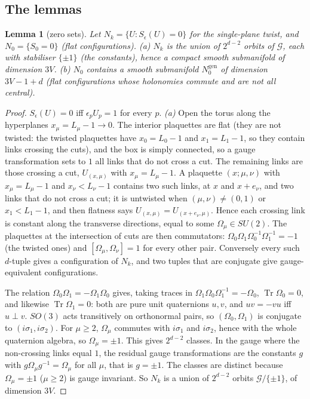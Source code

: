 \documentclass[11pt,a4paper]{article}
\theoremstyle{plain}
\newtheorem{lemma}[theorem]{Lemma}
\theoremstyle{definition}
\theoremstyle{remark}
\numberwithin{equation}{section}
\newcommand{\Tr}{\operatorname{Tr}}
\begin{document}
\subsection{The lemmas}
\begin{lemma}[zero sets]\label{lem:A}
Let $N_k=\{U:S_\epsilon(U)=0\}$ for the single-plane twist, and $N_0=\{S_0=0\}$ (flat configurations). (a) $N_k$ is the union of $2^{d-2}$ orbits of $\mathcal G$, each with stabiliser $\{\pm1\}$ (the constants), hence a compact smooth submanifold of dimension $3V$. (b) $N_0$ contains a smooth submanifold $N_0^{\mathrm{gen}}$ of dimension $3V-1+d$ (flat configurations whose holonomies commute and are not all central).
\end{lemma}
\begin{proof}
$S_\epsilon(U)=0$ iff $\epsilon_pU_p=1$ for every $p$. \emph{(a)} Open the torus along the hyperplanes $x_\mu=L_\mu-1\to0$. The interior plaquettes are flat (they are not twisted: the twisted plaquettes have $x_0=L_0-1$ and $x_1=L_1-1$, so they contain links crossing the cuts), and the box is simply connected, so a gauge transformation sets to $1$ all links that do not cross a cut. The remaining links are those crossing a cut, $U_{(x,\mu)}$ with $x_\mu=L_\mu-1$. A plaquette $(x;\mu,\nu)$ with $x_\mu=L_\mu-1$ and $x_\nu<L_\nu-1$ contains two such links, at $x$ and $x+e_\nu$, and two links that do not cross a cut; it is untwisted when $(\mu,\nu)\ne(0,1)$ or $x_1<L_1-1$, and then flatness says $U_{(x,\mu)}=U_{(x+e_\nu,\mu)}$. Hence each crossing link is constant along the transverse directions, equal to some $\Omega_\mu\in SU(2)$. The plaquettes at the intersection of cuts are then commutators: $\Omega_0\Omega_1\Omega_0^{-1}\Omega_1^{-1}=-1$ (the twisted ones) and $[\Omega_\mu,\Omega_\nu]=1$ for every other pair. Conversely every such $d$-tuple gives a configuration of $N_k$, and two tuples that are conjugate give gauge-equivalent configurations.

The relation $\Omega_0\Omega_1=-\Omega_1\Omega_0$ gives, taking traces in $\Omega_1\Omega_0\Omega_1^{-1}=-\Omega_0$, $\Tr\Omega_0=0$, and likewise $\Tr\Omega_1=0$: both are pure unit quaternions $u,v$, and $uv=-vu$ iff $u\perp v$. $SO(3)$ acts transitively on orthonormal pairs, so $(\Omega_0,\Omega_1)$ is conjugate to $(i\sigma_1,i\sigma_2)$. For $\mu\ge2$, $\Omega_\mu$ commutes with $i\sigma_1$ and $i\sigma_2$, hence with the whole quaternion algebra, so $\Omega_\mu=\pm1$. This gives $2^{d-2}$ classes. In the gauge where the non-crossing links equal $1$, the residual gauge transformations are the constants $g$ with $g\Omega_\mu g^{-1}=\Omega_\mu$ for all $\mu$, that is $g=\pm1$. The classes are distinct because $\Omega_\mu=\pm1$ ($\mu\ge2$) is gauge invariant. So $N_k$ is a union of $2^{d-2}$ orbits $\mathcal G/\{\pm1\}$, of dimension $3V$.


\end{proof}
\end{document}
